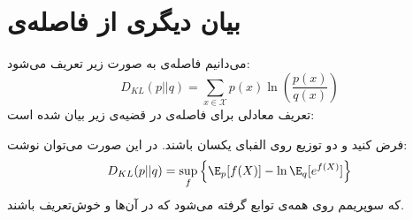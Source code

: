 	\section{بیان دیگری از فاصله‌ی
		}
	می‌دانیم فاصله‌ی
	به صورت زیر تعریف می‌شود:
	\begin{equation}
	D_{KL}(p||q) = \sum_{x\in \mathcal{X}} p(x)\ln(\frac{p(x)}{q(x)})
	\end{equation}
	تعریف معادلی برای فاصله‌ی
	در قضیه‌ی زیر بیان شده است:
	\begin{thm}
		فرض کنید 
		و
		دو توزیع روی الفبای یکسان
		باشند. در این صورت می‌توان نوشت:
		\begin{equation}
		D_{KL}(p||q) = \sup_f \left\{\E_p[f(X)] - \ln \E_q[e^{f(X)}]\right\}
		\end{equation}
		که سوپریمم روی همه‌ی توابع
		گرفته می‌شود که در آن‌ها
		و
		خوش‌تعریف باشند.
	\end{thm}
